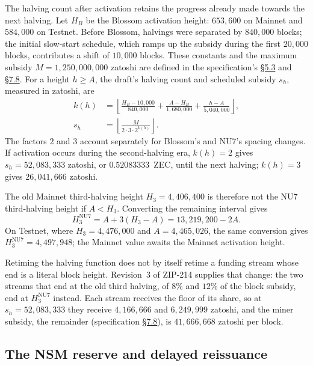 \documentclass[11pt,a4paper]{article}
\theoremstyle{definition}
\begin{document}
The halving count after activation retains the progress already made
towards the next halving. Let $H_B$ be the Blossom activation height:
$653{,}600$ on Mainnet and $584{,}000$ on Testnet. Before Blossom, halvings
were separated by $840{,}000$ blocks; the initial slow-start schedule,
which ramps up the subsidy during the first $20{,}000$ blocks, contributes
a shift of $10{,}000$ blocks. These constants and the maximum subsidy
$M=1{,}250{,}000{,}000$ zatoshi are defined in the specification's
\href{https://zips.z.cash/protocol/protocol.pdf\#constants}{\S5.3} and
\href{https://zips.z.cash/protocol/protocol.pdf\#subsidies}{\S7.8}.
For a height $h\geq A$, the draft's halving count and scheduled subsidy
$s_h$, measured in zatoshi, are
\begin{align}
 k(h)&=\left\lfloor
       \frac{H_B-10{,}000}{840{,}000}
       +\frac{A-H_B}{1{,}680{,}000}
       +\frac{h-A}{5{,}040{,}000}\right\rfloor,
       \label{eq:cons-nu7-halving}\\
 s_h&=\left\lfloor\frac{M}{2\cdot3\cdot2^{k(h)}}\right\rfloor.
       \label{eq:cons-nu7-subsidy}
\end{align}
The factors $2$ and $3$ account separately for Blossom's and NU7's
spacing changes. If activation occurs during the second-halving era,
$k(h)=2$ gives $s_h=52{,}083{,}333$ zatoshi, or $0.52083333$~ZEC, until
the next halving; $k(h)=3$ gives $26{,}041{,}666$ zatoshi.

The old Mainnet third-halving height $H_3=4{,}406{,}400$ is therefore not
the NU7 third-halving height if $A<H_3$. Converting the remaining interval
gives
\[
 H_3^{\mathrm{NU7}}=A+3(H_3-A)=13{,}219{,}200-2A.
\]
On Testnet, where $H_3=4{,}476{,}000$ and $A=4{,}465{,}026$, the same
conversion gives $H_3^{\mathrm{NU7}}=4{,}497{,}948$; the Mainnet value awaits
the Mainnet activation height.

Retiming the halving function does not by itself retime a funding stream
whose end is a literal block height. Revision~3 of ZIP-214 supplies that
change: the two streams that end at the old third halving, of $8\%$ and
$12\%$ of the block subsidy, end at $H_3^{\mathrm{NU7}}$ instead. Each
stream receives the floor of its share, so at $s_h=52{,}083{,}333$ they
receive $4{,}166{,}666$ and $6{,}249{,}999$ zatoshi, and the miner subsidy,
the remainder (specification
\href{https://zips.z.cash/protocol/protocol.pdf\#subsidies}{\S7.8}), is
$41{,}666{,}668$ zatoshi per block.

\subsection{The NSM reserve and delayed reissuance}
\label{sec:cons-nu7-nsm}
\end{document}
